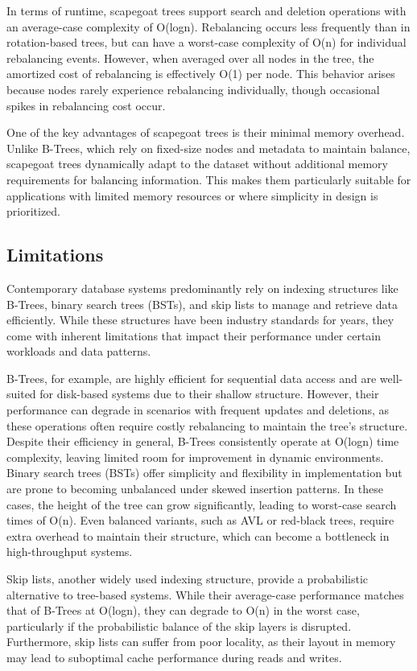 \documentclass[sigconf]{acmart}
\begin{document}
In terms of runtime, scapegoat trees support search and deletion operations with an average-case complexity of O(logn). Rebalancing occurs less frequently than in rotation-based trees, but can have a worst-case complexity of O(n) for individual rebalancing events. However, when averaged over all nodes in the tree, the amortized cost of rebalancing is effectively O(1) per node. This behavior arises because nodes rarely experience rebalancing individually, though occasional spikes in rebalancing cost occur.

One of the key advantages of scapegoat trees is their minimal memory overhead. Unlike B-Trees, which rely on fixed-size nodes and metadata to maintain balance, scapegoat trees dynamically adapt to the dataset without additional memory requirements for balancing information. This makes them particularly suitable for applications with limited memory resources or where simplicity in design is prioritized.

\subsection{Limitations}
Contemporary database systems predominantly rely on indexing structures like B-Trees, binary search trees (BSTs), and skip lists to manage and retrieve data efficiently. While these structures have been industry standards for years, they come with inherent limitations that impact their performance under certain workloads and data patterns.

B-Trees, for example, are highly efficient for sequential data access and are well-suited for disk-based systems due to their shallow structure. However, their performance can degrade in scenarios with frequent updates and deletions, as these operations often require costly rebalancing to maintain the tree's structure. Despite their efficiency in general, B-Trees consistently operate at O(logn) time complexity, leaving limited room for improvement in dynamic environments.
Binary search trees (BSTs) offer simplicity and flexibility in implementation but are prone to becoming unbalanced under skewed insertion patterns. In these cases, the height of the tree can grow significantly, leading to worst-case search times of O(n). Even balanced variants, such as AVL or red-black trees, require extra overhead to maintain their structure, which can become a bottleneck in high-throughput systems.

Skip lists, another widely used indexing structure, provide a probabilistic alternative to tree-based systems. While their average-case performance matches that of B-Trees at O(logn), they can degrade to O(n) in the worst case, particularly if the probabilistic balance of the skip layers is disrupted. Furthermore, skip lists can suffer from poor locality, as their layout in memory may lead to suboptimal cache performance during reads and writes.
\end{document}
